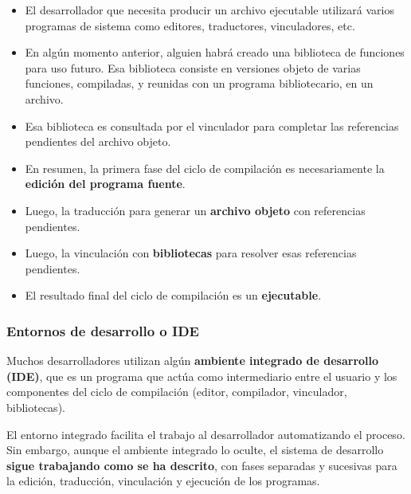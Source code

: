 \documentclass[spanish,a4paper,]{article}
\begin{document}
\begin{itemize}
\item
  El desarrollador que necesita producir un archivo ejecutable utilizará
  varios programas de sistema como editores, traductores, vinculadores,
  etc.
\item
  En algún momento anterior, alguien habrá creado una biblioteca de
  funciones para uso futuro. Esa biblioteca consiste en versiones objeto
  de varias funciones, compiladas, y reunidas con un programa
  bibliotecario, en un archivo.
\item
  Esa biblioteca es consultada por el vinculador para completar las
  referencias pendientes del archivo objeto.
\item
  En resumen, la primera fase del ciclo de compilación es necesariamente
  la \textbf{edición del programa fuente}.
\item
  Luego, la traducción para generar un \textbf{archivo objeto} con
  referencias pendientes.
\item
  Luego, la vinculación con \textbf{bibliotecas} para resolver esas
  referencias pendientes.
\item
  El resultado final del ciclo de compilación es un \textbf{ejecutable}.
\end{itemize}

\hypertarget{entornos-de-desarrollo-o-ide}{%
\subsubsection{Entornos de desarrollo o
IDE}\label{entornos-de-desarrollo-o-ide}}

Muchos desarrolladores utilizan algún \textbf{ambiente integrado de
desarrollo (IDE)}, que es un programa que actúa como intermediario entre
el usuario y los componentes del ciclo de compilación (editor,
compilador, vinculador, bibliotecas).

El entorno integrado facilita el trabajo al desarrollador automatizando
el proceso. Sin embargo, aunque el ambiente integrado lo oculte, el
sistema de desarrollo \textbf{sigue trabajando como se ha descrito}, con
fases separadas y sucesivas para la edición, traducción, vinculación y
ejecución de los programas.
\end{document}
